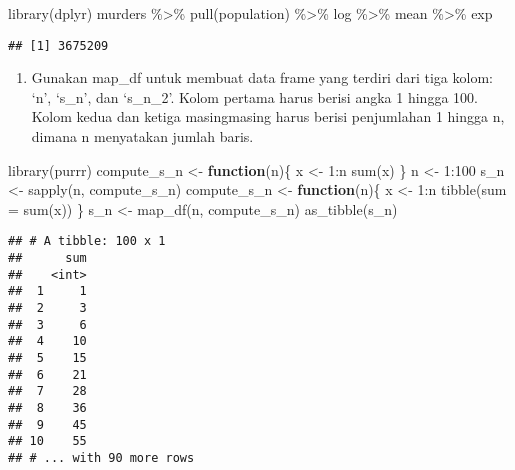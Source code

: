 \documentclass[
]{article}
\newenvironment{Shaded}{\begin{snugshade}}{\end{snugshade}}
\newcommand{\AttributeTok}[1]{\textcolor[rgb]{0.77,0.63,0.00}{#1}}
\newcommand{\ControlFlowTok}[1]{\textcolor[rgb]{0.13,0.29,0.53}{\textbf{#1}}}
\newcommand{\DecValTok}[1]{\textcolor[rgb]{0.00,0.00,0.81}{#1}}
\newcommand{\FunctionTok}[1]{\textcolor[rgb]{0.00,0.00,0.00}{#1}}
\newcommand{\NormalTok}[1]{#1}
\newcommand{\OtherTok}[1]{\textcolor[rgb]{0.56,0.35,0.01}{#1}}
\newcommand{\SpecialCharTok}[1]{\textcolor[rgb]{0.00,0.00,0.00}{#1}}
\providecommand{\tightlist}{%
  \setlength{\itemsep}{0pt}\setlength{\parskip}{0pt}}
\begin{document}
\begin{Shaded}
\begin{Highlighting}[]
\FunctionTok{library}\NormalTok{(dplyr)}
\NormalTok{murders }\SpecialCharTok{\%\textgreater{}\%} 
     \FunctionTok{pull}\NormalTok{(population) }\SpecialCharTok{\%\textgreater{}\%} 
\NormalTok{     log }\SpecialCharTok{\%\textgreater{}\%}
\NormalTok{     mean }\SpecialCharTok{\%\textgreater{}\%} 
\NormalTok{     exp}
\end{Highlighting}
\end{Shaded}

\begin{verbatim}
## [1] 3675209
\end{verbatim}

\begin{enumerate}
\def\labelenumi{\arabic{enumi}.}
\setcounter{enumi}{3}
\tightlist
\item
  Gunakan map\_df untuk membuat data frame yang terdiri dari tiga kolom:
  `n', `s\_n', dan `s\_n\_2'. Kolom pertama harus berisi angka 1 hingga
  100. Kolom kedua dan ketiga masingmasing harus berisi penjumlahan 1
  hingga n, dimana n menyatakan jumlah baris.
\end{enumerate}

\begin{Shaded}
\begin{Highlighting}[]
\FunctionTok{library}\NormalTok{(purrr)}
\NormalTok{compute\_s\_n }\OtherTok{\textless{}{-}} \ControlFlowTok{function}\NormalTok{(n)\{ }
\NormalTok{ x }\OtherTok{\textless{}{-}} \DecValTok{1}\SpecialCharTok{:}\NormalTok{n }
 \FunctionTok{sum}\NormalTok{(x) }
\NormalTok{\} }
\NormalTok{n }\OtherTok{\textless{}{-}} \DecValTok{1}\SpecialCharTok{:}\DecValTok{100} 
\NormalTok{s\_n }\OtherTok{\textless{}{-}} \FunctionTok{sapply}\NormalTok{(n, compute\_s\_n)}
\NormalTok{compute\_s\_n }\OtherTok{\textless{}{-}} \ControlFlowTok{function}\NormalTok{(n)\{ }
\NormalTok{ x }\OtherTok{\textless{}{-}} \DecValTok{1}\SpecialCharTok{:}\NormalTok{n }
 \FunctionTok{tibble}\NormalTok{(}\AttributeTok{sum =} \FunctionTok{sum}\NormalTok{(x)) }
\NormalTok{\} }
\NormalTok{s\_n }\OtherTok{\textless{}{-}} \FunctionTok{map\_df}\NormalTok{(n, compute\_s\_n)}
\FunctionTok{as\_tibble}\NormalTok{(s\_n)}
\end{Highlighting}
\end{Shaded}

\begin{verbatim}
## # A tibble: 100 x 1
##      sum
##    <int>
##  1     1
##  2     3
##  3     6
##  4    10
##  5    15
##  6    21
##  7    28
##  8    36
##  9    45
## 10    55
## # ... with 90 more rows
\end{verbatim}
\end{document}

